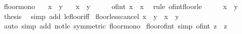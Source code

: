 \begin{isabellebody}
\endisatagproof
{\isafoldproof}%
%
\isadelimproof
\isanewline
%
\endisadelimproof
\isanewline
{}\isamarkupfalse%
\ floor{\isacharunderscore}{\kern0pt}mono{\isacharcolon}{\kern0pt}\isanewline
\ \ \ {\isachardoublequoteopen}x\ {\isasymle}\ y{\isachardoublequoteclose}\isanewline
\ \ \ {\isachardoublequoteopen}{\isasymlfloor}x{\isasymrfloor}\ {\isasymle}\ {\isasymlfloor}y{\isasymrfloor}{\isachardoublequoteclose}\isanewline
%
\isadelimproof
%
\endisadelimproof
%
\isatagproof
{}\isamarkupfalse%
\ {\isacharminus}{\kern0pt}\isanewline
\ \ \isamarkupfalse%
\ {\isachardoublequoteopen}of{\isacharunderscore}{\kern0pt}int\ {\isasymlfloor}x{\isasymrfloor}\ {\isasymle}\ x{\isachardoublequoteclose}\ \isamarkupfalse%
\ {\isacharparenleft}{\kern0pt}rule\ of{\isacharunderscore}{\kern0pt}int{\isacharunderscore}{\kern0pt}floor{\isacharunderscore}{\kern0pt}le{\isacharparenright}{\kern0pt}\isanewline
\ \ \isamarkupfalse%
\ \isamarkupfalse%
\ {\isacartoucheopen}x\ {\isasymle}\ y{\isacartoucheclose}\isanewline
\ \ \isamarkupfalse%
\ \isamarkupfalse%
\ {\isacharquery}{\kern0pt}thesis\ \isamarkupfalse%
\ {\isacharparenleft}{\kern0pt}simp\ add{\isacharcolon}{\kern0pt}\ le{\isacharunderscore}{\kern0pt}floor{\isacharunderscore}{\kern0pt}iff{\isacharparenright}{\kern0pt}\isanewline
{}\isamarkupfalse%
%
\endisatagproof
{\isafoldproof}%
%
\isadelimproof
\isanewline
%
\endisadelimproof
\isanewline
{}\isamarkupfalse%
\ floor{\isacharunderscore}{\kern0pt}less{\isacharunderscore}{\kern0pt}cancel{\isacharcolon}{\kern0pt}\ {\isachardoublequoteopen}{\isasymlfloor}x{\isasymrfloor}\ {\isacharless}{\kern0pt}\ {\isasymlfloor}y{\isasymrfloor}\ {\isasymLongrightarrow}\ x\ {\isacharless}{\kern0pt}\ y{\isachardoublequoteclose}\isanewline
%
\isadelimproof
\ \ %
\endisadelimproof
%
\isatagproof
{}\isamarkupfalse%
\ {\isacharparenleft}{\kern0pt}auto\ simp\ add{\isacharcolon}{\kern0pt}\ not{\isacharunderscore}{\kern0pt}le\ {\isacharbrackleft}{\kern0pt}symmetric{\isacharbrackright}{\kern0pt}\ floor{\isacharunderscore}{\kern0pt}mono{\isacharparenright}{\kern0pt}%
\endisatagproof
{\isafoldproof}%
%
\isadelimproof
\isanewline
%
\endisadelimproof
\isanewline
{}\isamarkupfalse%
\ floor{\isacharunderscore}{\kern0pt}of{\isacharunderscore}{\kern0pt}int\ {\isacharbrackleft}{\kern0pt}simp{\isacharbrackright}{\kern0pt}{\isacharcolon}{\kern0pt}\ {\isachardoublequoteopen}{\isasymlfloor}of{\isacharunderscore}{\kern0pt}int\ z{\isasymrfloor}\ {\isacharequal}{\kern0pt}\ z{\isachardoublequoteclose}\isanewline

\end{isabellebody}
